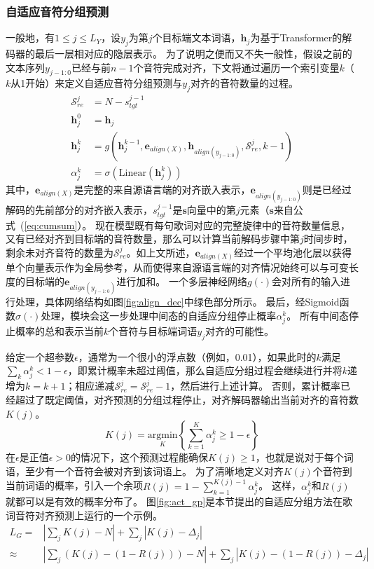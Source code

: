 \subsubsection{自适应音符分组预测}
\label{subsec:act}
一般地，有$1 \leq j \leq L_Y$，设$y_j$为第$j$个目标端文本词语，$\mathbf{h}_j$为基于Transformer的解码器的最后一层相对应的隐层表示。
为了说明之便而又不失一般性，假设之前的文本序列$y_{j-1:0}$已经与前$n-1$个音符完成对齐，下文将通过遍历一个索引变量$k$（$k$从1开始）来定义自适应音符分组预测与$y_j$对齐的音符数量的过程。
\begin{align}
    \mathcal{S}_{re}^j &= N -s^{j-1}_{tgt} \\
     \mathbf{h}_j^0 &= \mathbf{h}_j  \\
     \mathbf{h}_j^k &= g(\mathbf{h}_j^{k-1}, \mathbf{e}_{align(X)}, \mathbf{h}_{align(y_{j-1:0})}, \mathcal{S}_{re}^j, k-1) \\
     \alpha_j^k &= \sigma(\text{Linear}(\mathbf{h}_j^k))
\end{align}
其中，$\mathbf{e}_{align(X)}$是完整的来自源语言端的对齐嵌入表示，$\mathbf{e}_{align(y_{j-1:0})}$则是已经过解码的先前部分的对齐嵌入表示，$s^{j-1}_{tgt}$是$\mathbf{s}$向量中的第$j$元素（$\mathbf{s}$来自公式~(\ref{eq:cumsum}）。
现在模型既有每句歌词对应的完整旋律中的音符数量信息，又有已经对齐到目标端的音符数量，那么可以计算当前解码步骤中第$j$时间步时，剩余未对齐音符的数量为$\mathcal{S}_{re}^j$。如上文所述，$\mathbf{e}_{align(X)}$经过一个平均池化层以获得单个向量表示作为全局参考，从而使得来自源语言端的对齐情况始终可以与可变长度的目标端的$\mathbf{e}_{align(y_{j-1:0})}$进行加和。
一个多层神经网络$g(\cdot)$会对所有的输入进行处理，具体网络结构如图\ref{fig:align_dec}中绿色部分所示。
最后，经Sigmoid函数$\sigma(\cdot)$处理，模块会这一步处理中间态的自适应分组停止概率$\alpha_j^k$。
所有中间态停止概率的总和表示当前$k$个音符与目标端词语$y_j$对齐的可能性。

给定一个超参数$\epsilon$，通常为一个很小的浮点数（例如，0.01），如果此时的$k$满足$\sum_k \alpha_j^k < 1-\epsilon$，即累计概率未超过阈值，那么自适应分组过程会继续进行并将$k$递增为$k=k+1$；相应递减$\mathcal{S}_{re}^j=\mathcal{S}_{re}^j-1$，然后进行上述计算。
否则，累计概率已经超过了既定阈值，对齐预测的分组过程停止，对齐解码器输出当前对齐的音符数$K(j)$。
\begin{equation}
\label{eq:Kj}
    K(j) = \underset{K}{\mathrm{argmin}} \left\{\sum_{k=1}^K \alpha_j^k \geq 1-\epsilon \right\}
\end{equation}
在$\epsilon$是正值$\epsilon>0$的情况下，这个预测过程能确保$K(j)\geq1$，也就是说对于每个词语，至少有一个音符会被对齐到该词语上。
为了清晰地定义对齐$K(j)$个音符到当前词语的概率，引入一个余项$R(j) = 1-\sum_{k=1}^{K(j)-1} \alpha_j^k$。
这样，$\alpha_j^k$和$R(j)$就都可以是有效的概率分布了。
图\ref{fig:act_gp}是本节提出的自适应分组方法在歌词音符对齐预测上运行的一个示例。
\begin{equation}
\begin{array}{rl}
    L_G = & \left| \sum_j K(j) - N \right| + \sum_j \left|K(j) - \Delta_j\right| \\
    \approx &\left|\sum_j \left(K(j) - (1 - R(j))\right) - N \right| + \sum_j \left|K(j) - (1 - R(j)) - \Delta_j\right|
\end{array}
\end{equation}

